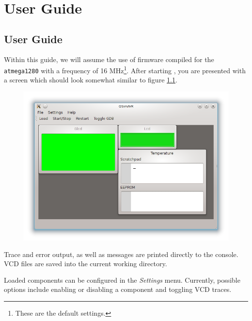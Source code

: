 
\chapter{User Guide}


\section{\qsimavr User Guide}

Within this guide, we will assume the use of firmware compiled for the
\verb|atmega1280| with a frequency of 16 \ac{MHz}\footnote{
%
These are the default settings.
%
}. After starting \qsimavr, you are presented with a screen which should look
somewhat similar to figure \ref{fig:qsimavr}.

\begin{figure}[ht]
\includegraphics[width=\textwidth]{images/qsimavr}
\caption{\qsimavr}
\label{fig:qsimavr}
\end{figure}

Trace and error output, as well as \simavr messages are printed directly to the
console. \ac{VCD} files are saved into the current working directory.

Loaded components can be configured in the \emph{Settings} menu. Currently,
possible options include enabling or disabling a component and toggling \ac{VCD}
traces.

